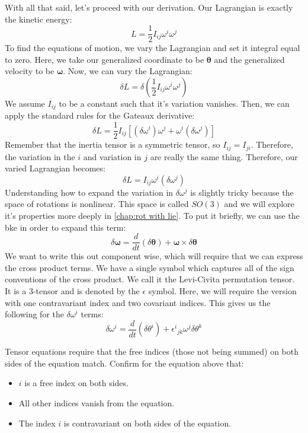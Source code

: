 With all that said, let's proceed with our derivation. Our \gls{Lagrangian} is exactly the kinetic energy:
$$L=\frac{1}{2}I_{ij}\omega^i\omega^j$$
To find the equations of motion, we vary the \gls{Lagrangian} and set it integral equal to zero. Here, we take our generalized coordinate to be $\bm{\theta}$ and the generalized velocity to be $\bm{\omega}$. Now, we can vary the \gls{Lagrangian}:
$$\delta L=\delta(\frac{1}{2}I_{ij}\omega^i\omega^j)$$
We assume $I_{ij}$ to be a constant such that it's variation vanishes. Then, we can apply the standard rules for the Gateaux derivative:
$$\delta L = \frac{1}{2}I_{ij}\left[(\delta \omega^i)\omega^j+\omega^i(\delta\omega^j)\right]$$
Remember that the inertia tensor is a symmetric tensor, so $I_{ij}=I_{ji}$. Therefore, the variation in the $i$ and variation in $j$ are really the same thing. Therefore, our varied \gls{Lagrangian} becomes:
$$\delta L = I_{ij}\omega^i(\delta\omega^j)$$
Understanding how to expand the variation in $\delta\omega^j$ is slightly tricky because the space of rotations is nonlinear. This space is called $SO(3)$ and we will explore it's properties more deeply in \autoref{chap:rot with lie}. To put it briefly, we can use the \gls{bke} in order to expand this term:
$$\delta\bm{\omega}=\frac{d}{dt}(\delta\bm{\theta})+\bm{\omega}\times\delta\bm{\theta}$$
We want to write this out component wise, which will require that we can express the cross product terms. We have a single symbol which captures all of the sign conventions of the cross product. We call it the Levi-Civita permutation tensor. It is a 3-tensor and is denoted by the $\epsilon$ symbol. Here, we will require the version with one contravariant index and two covariant indices. This gives us the following for the $\delta\omega^i$ terms:
$$\delta\omega^i=\frac{d}{dt}(\delta\theta^i)+{\epsilon^i}_{jk}\omega^j\delta\theta^k$$
\begin{exercise}
Tensor equations require that the free indices (those not being summed) on both sides of the equation match. Confirm for the equation above that:
\begin{itemize}
    \item $i$ is a free index on both sides.
    \item All other indices vanish from the equation.
    \item The index $i$ is contravariant on both sides of the equation.
\end{itemize}
\end{exercise}

